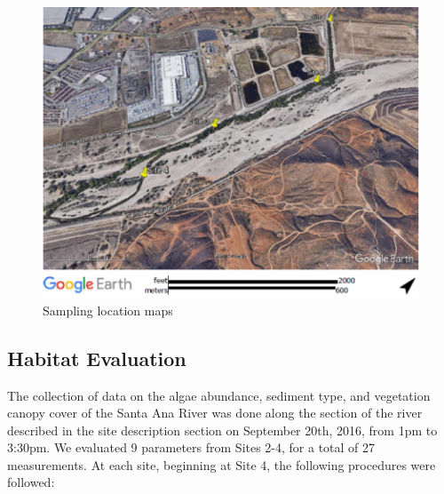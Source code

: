 \documentclass{article}\usepackage[]{graphicx}\usepackage[]{color}
\begin{document}
\begin{figure}[!ht]
\includegraphics[width=1.00\textwidth]{Figures/SiteMap}
\caption{Sampling location maps}
\label{SAR_Image}
\end{figure}

\subsection{Habitat Evaluation}

The collection of data on the algae abundance, sediment type, and vegetation canopy cover of the Santa Ana River was done along the section of the river described in the site description section on September 20th, 2016, from 1pm to 3:30pm. We evaluated 9 parameters from Sites 2-4, for a total of 27 measurements. At each site, beginning at Site 4, the following procedures were followed: 
\end{document}
